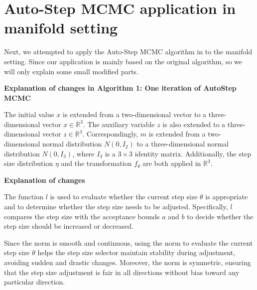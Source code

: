 \documentclass{article}
\begin{document}


\section{Auto-Step MCMC application in manifold setting}
Next, we attempted to apply the Auto-Step MCMC algorithm in \cite{autostep} to the manifold setting. Since our application is mainly based on the original algorithm, so we will only explain some small modified parts.

\textbf{Explanation of changes in Algorithm 1: One iteration of AutoStep MCMC}

The initial value $x$ is extended from a two-dimensional vector to a three-dimensional vector $x \in \mathbb{R}^3$. The auxiliary variable $z$ is also extended to a three-dimensional vector $z \in \mathbb{R}^3$. Correspondingly, $m$ is extended from a two-dimensional normal distribution $N(0, I_2)$ to a three-dimensional normal distribution $N(0, I_3)$, where $I_3$ is a $3 \times 3$ identity matrix. Additionally, the step size distribution $\eta$ and the transformation $f_\theta$ are both applied in $\mathbb{R}^3$.




\textbf{Explanation of changes}


The function $l$ is used to evaluate whether the current step size $\theta$ is appropriate and to determine whether the step size needs to be adjusted. Specifically, $l$ compares the step size with the acceptance bounds $a$ and $b$ to decide whether the step size should be increased or decreased.

Since the norm is smooth and continuous, using the norm to evaluate the current step size $\theta$ helps the step size selector maintain stability during adjustment, avoiding sudden and drastic changes. Moreover, the norm is symmetric, ensuring that the step size adjustment is fair in all directions without bias toward any particular direction.
\end{document}

